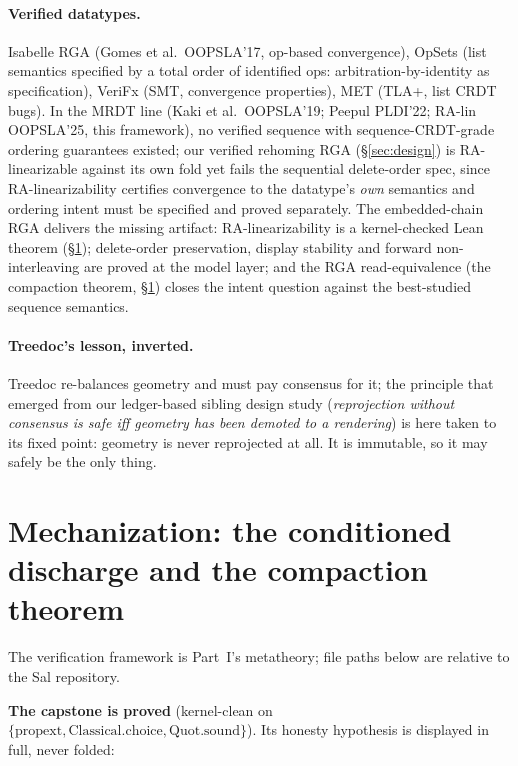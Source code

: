 \documentclass[11pt]{article}
\begin{document}
\paragraph{Verified datatypes.} Isabelle RGA (Gomes et al.\ OOPSLA'17,
op-based convergence), OpSets (list semantics specified by a total
order of identified ops: arbitration-by-identity as specification),
VeriFx (SMT, convergence properties), MET (TLA+, list CRDT bugs). In
the MRDT line (Kaki et al.\ OOPSLA'19; Peepul PLDI'22; RA-lin
OOPSLA'25, this framework), no verified sequence with
sequence-CRDT-grade ordering guarantees existed; our verified rehoming
RGA (\S\ref{sec:design}) is RA-linearizable against its own fold yet
fails the sequential delete-order spec, since RA-linearizability
certifies convergence to the datatype's \emph{own} semantics and
ordering intent must be specified and proved separately. The
embedded-chain RGA delivers the missing artifact:
RA-linearizability is a kernel-checked Lean theorem
(\S\ref{sec:mechanization}); delete-order preservation, display
stability and forward non-interleaving are proved at the model layer;
and the RGA read-equivalence (the compaction theorem,
\S\ref{sec:mechanization}) closes the intent question against the
best-studied sequence semantics.

\paragraph{Treedoc's lesson, inverted.} Treedoc re-balances geometry
and must pay consensus for it; the principle that emerged from our
ledger-based sibling design study
(\emph{reprojection without consensus is safe iff geometry has been
demoted to a rendering}) is here taken to its fixed point: geometry is
never reprojected at all. It is immutable, so it may safely be the
only thing.

\section{Mechanization: the conditioned discharge and the compaction
theorem}
\label{sec:mechanization}

The verification framework is Part~I's metatheory; file paths below
are relative to the Sal repository.

\textbf{The capstone is proved} (kernel-clean on
$\{\mathrm{propext}, \mathrm{Classical.choice},
\mathrm{Quot.sound}\}$). Its honesty hypothesis is displayed in
full, never folded:
\end{document}
